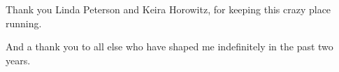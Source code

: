 
Thank you Linda Peterson and Keira Horowitz, for keeping this crazy place running.


And a thank you to all else who have shaped me indefinitely in the past two years.

 



  






 
\afterpage{\blankpage}


